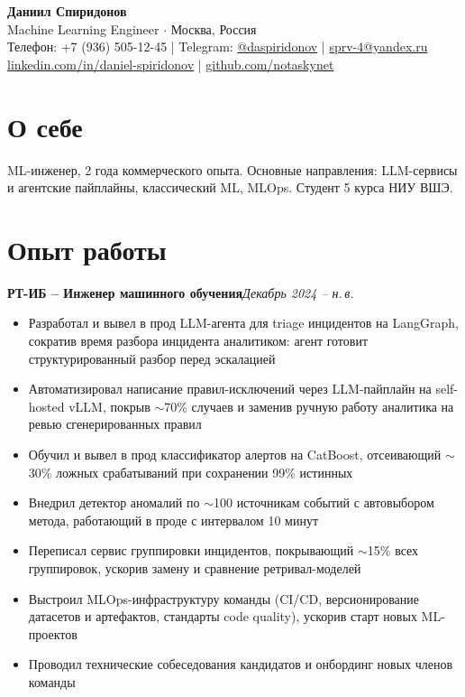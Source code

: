 \documentclass[a4paper,11pt]{article}
\begin{document}
\pagestyle{empty}

\begin{center}
{\huge \textbf{Даниил Спиридонов}}\\[4pt]
Machine Learning Engineer $\cdot$ Москва, Россия\\[2pt]
Телефон: +7 (936) 505-12-45 | Telegram: \href{https://t.me/daspiridonov}{@daspiridonov} | \href{mailto:sprv-4@yandex.ru}{sprv-4@yandex.ru}\\
\href{https://www.linkedin.com/in/daniel-spiridonov/}{linkedin.com/in/daniel-spiridonov} | \href{https://github.com/notaskynet}{github.com/notaskynet}
\end{center}

\section*{О себе}
ML-инженер, 2 года коммерческого опыта. Основные направления: LLM-сервисы и агентские пайплайны, классический ML, MLOps. Студент 5 курса НИУ ВШЭ.

\section*{Опыт работы}
\textbf{РТ-ИБ -- Инженер машинного обучения}\hfill \textit{Декабрь 2024 -- н.\,в.}

\begin{itemize}
  \item Разработал и вывел в прод LLM-агента для triage инцидентов на LangGraph, сократив время разбора инцидента аналитиком: агент готовит структурированный разбор перед эскалацией
  \item Автоматизировал написание правил-исключений через LLM-пайплайн на self-hosted vLLM, покрыв \(\sim\)70\% случаев и заменив ручную работу аналитика на ревью сгенерированных правил
  \item Обучил и вывел в прод классификатор алертов на CatBoost, отсеивающий \(\sim\)30\% ложных срабатываний при сохранении 99\% истинных
  \item Внедрил детектор аномалий по \(\sim\)100 источникам событий с автовыбором метода, работающий в проде с интервалом 10 минут
  \item Переписал сервис группировки инцидентов, покрывающий \(\sim\)15\% всех группировок, ускорив замену и сравнение ретривал-моделей
  \item Выстроил MLOps-инфраструктуру команды (CI/CD, версионирование датасетов и артефактов, стандарты code quality), ускорив старт новых ML-проектов
  \item Проводил технические собеседования кандидатов и онбординг новых членов команды
\end{itemize}
\end{document}
